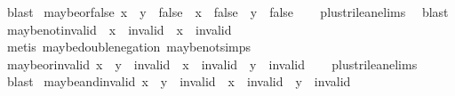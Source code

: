 \begin{isabellebody}
\ blast%
\endisatagproof
{\isafoldproof}%
%
\isadelimproof
\isanewline
%
\endisadelimproof
\isanewline
{}\isamarkupfalse%
\ maybe{\isacharunderscore}or{\isacharunderscore}false{\isacharcolon}\ {\isachardoublequoteopen}{\isacharparenleft}x\ {\isasymor}\isactrlsub {\isacharquery}\ y\ {\isacharequal}\ false{\isacharparenright}\ {\isacharequal}\ {\isacharparenleft}x\ {\isacharequal}\ false\ {\isasymand}\ y\ {\isacharequal}\ false{\isacharparenright}{\isachardoublequoteclose}\isanewline
%
\isadelimproof
\ \ %
\endisadelimproof
%
\isatagproof
{}\isamarkupfalse%
\ plus{\isacharunderscore}trilean{\isachardot}elims\ \isamarkupfalse%
\ blast%
\endisatagproof
{\isafoldproof}%
%
\isadelimproof
\isanewline
%
\endisadelimproof
\isanewline
{}\isamarkupfalse%
\ maybe{\isacharunderscore}not{\isacharunderscore}invalid{\isacharcolon}\ {\isachardoublequoteopen}{\isacharparenleft}{\isasymnot}\isactrlsub {\isacharquery}\ x\ {\isacharequal}\ invalid{\isacharparenright}\ {\isacharequal}\ {\isacharparenleft}x\ {\isacharequal}\ invalid{\isacharparenright}{\isachardoublequoteclose}\isanewline
%
\isadelimproof
\ \ %
\endisadelimproof
%
\isatagproof
{}\isamarkupfalse%
\ {\isacharparenleft}metis\ maybe{\isacharunderscore}double{\isacharunderscore}negation\ maybe{\isacharunderscore}not{\isachardot}simps{\isacharparenleft}{}{\isacharparenright}{\isacharparenright}%
\endisatagproof
{\isafoldproof}%
%
\isadelimproof
\isanewline
%
\endisadelimproof
\isanewline
{}\isamarkupfalse%
\ maybe{\isacharunderscore}or{\isacharunderscore}invalid{\isacharcolon}\ {\isachardoublequoteopen}{\isacharparenleft}x\ {\isasymor}\isactrlsub {\isacharquery}\ y\ {\isacharequal}\ invalid{\isacharparenright}\ {\isacharequal}\ {\isacharparenleft}x\ {\isacharequal}\ invalid\ {\isasymor}\ y\ {\isacharequal}\ invalid{\isacharparenright}{\isachardoublequoteclose}\isanewline
%
\isadelimproof
\ \ %
\endisadelimproof
%
\isatagproof
{}\isamarkupfalse%
\ plus{\isacharunderscore}trilean{\isachardot}elims\ \isamarkupfalse%
\ blast%
\endisatagproof
{\isafoldproof}%
%
\isadelimproof
\isanewline
%
\endisadelimproof
\isanewline
{}\isamarkupfalse%
\ maybe{\isacharunderscore}and{\isacharunderscore}invalid{\isacharcolon}\ {\isachardoublequoteopen}{\isacharparenleft}x\ {\isasymand}\isactrlsub {\isacharquery}\ y\ {\isacharequal}\ invalid{\isacharparenright}\ {\isacharequal}\ {\isacharparenleft}x\ {\isacharequal}\ invalid\ {\isasymor}\ y\ {\isacharequal}\ invalid{\isacharparenright}{\isachardoublequoteclose}\isanewline

\end{isabellebody}
